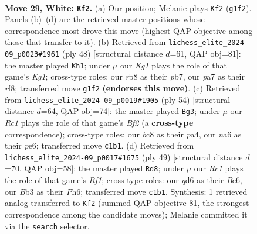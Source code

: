 \documentclass[11pt]{article}
\begin{document}
\clearpage

\begin{figure}[p]\centering
\begin{subfigure}{0.46\textwidth}\centering
\resizebox{\linewidth}{!}{%
\newchessgame
\chessboard[
  setfen={1rb5/pp4k1/n1pq2p1/6pp/3P4/PB1Q1PP1/1P2R2P/2R3K1 w - - 4 29},
  showmover=false,
  pgfstyle=straightmove, color=movearrow, markmove={g1-f2}
]}
\caption{}
\end{subfigure}\hfill
\begin{subfigure}{0.46\textwidth}\centering
\resizebox{\linewidth}{!}{%
\newchessgame
\chessboard[
  setfen={1k3r2/1p2p3/pqp1p3/4Pn1p/1P1P4/3Q2P1/P5BP/1R4K1 w - - 2 25},
  showmover=false,
  pgfstyle=straightmove, color=movearrow, markmove={g1-h1}
]}
\caption{}
\end{subfigure}
\\[4pt]
\begin{subfigure}{0.46\textwidth}\centering
\resizebox{\linewidth}{!}{%
\newchessgame
\chessboard[
  setfen={5rk1/6p1/p1pqpb1p/8/pPPPQ3/P2R3P/5BP1/6K1 w - - 2 28},
  showmover=false,
  pgfstyle=straightmove, color=movearrow, markmove={f2-g3}
]}
\caption{}
\end{subfigure}\hfill
\begin{subfigure}{0.46\textwidth}\centering
\resizebox{\linewidth}{!}{%
\newchessgame
\chessboard[
  setfen={5rk1/5pp1/2b1pq1p/p7/Pp3PQ1/1B4P1/1PP4P/1K1R4 b - - 0 25},
  showmover=false,
  pgfstyle=straightmove, color=movearrow, markmove={f8-d8}
]}
\caption{}
\end{subfigure}
\caption{\textbf{Move 29, White: \texttt{Kf2}.} (a) Our position; Melanie plays \texttt{Kf2} (\texttt{g1f2}). Panels (b)--(d) are the retrieved master positions whose correspondence most drove this move (highest QAP objective among those that transfer to it). (b) Retrieved from \texttt{lichess\_elite\_2024-09\_p0023\#1961} (ply 48) [structural distance $d$=61, QAP obj=81]: the master played \texttt{Kh1}; under $\mu$ our \emph{Kg1} plays the role of that game's \emph{Kg1}; cross-type roles: our \emph{r}b8 as their \emph{p}b7, our \emph{p}a7 as their \emph{r}f8; transferred move \texttt{g1f2} \textbf{(endorses this move)}. (c) Retrieved from \texttt{lichess\_elite\_2024-09\_p0019\#1905} (ply 54) [structural distance $d$=64, QAP obj=74]: the master played \texttt{Bg3}; under $\mu$ our \emph{Rc1} plays the role of that game's \emph{Bf2} (a \textbf{cross-type} correspondence); cross-type roles: our \emph{b}c8 as their \emph{p}a4, our \emph{n}a6 as their \emph{p}e6; transferred move \texttt{c1b1}. (d) Retrieved from \texttt{lichess\_elite\_2024-09\_p0017\#1675} (ply 49) [structural distance $d$=70, QAP obj=58]: the master played \texttt{Rd8}; under $\mu$ our \emph{Rc1} plays the role of that game's \emph{Rf1}; cross-type roles: our \emph{q}d6 as their \emph{B}c6, our \emph{B}b3 as their \emph{P}h6; transferred move \texttt{c1b1}. Synthesis: 1 retrieved analog transferred to \texttt{Kf2} (summed QAP objective 81, the strongest correspondence among the candidate moves); Melanie committed it via the \texttt{search} selector.}
\label{fig:thought-m56}
\end{figure}
\end{document}
